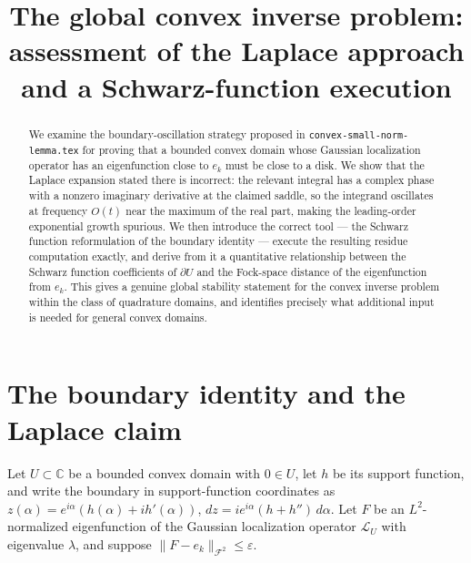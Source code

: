 \documentclass[a4paper,11pt,reqno]{amsart}
\begin{document}
\title{The global convex inverse problem:\\
assessment of the Laplace approach and a Schwarz-function execution}

\maketitle

\begin{abstract}
We examine the boundary-oscillation strategy proposed in
\texttt{convex-small-norm-lemma.tex} for proving that a bounded convex domain
whose Gaussian localization operator has an eigenfunction close to $e_k$ must
be close to a disk. We show that the Laplace expansion stated there is
incorrect: the relevant integral has a complex phase with a nonzero imaginary
derivative at the claimed saddle, so the integrand oscillates at frequency
$O(t)$ near the maximum of the real part, making the leading-order exponential
growth spurious. We then introduce the correct tool --- the Schwarz function
reformulation of the boundary identity --- execute the resulting residue
computation exactly, and derive from it a quantitative relationship between the
Schwarz function coefficients of $\partial U$ and the Fock-space distance of
the eigenfunction from $e_k$.
This gives a genuine global stability statement for the convex inverse problem
within the class of quadrature domains, and identifies precisely what additional
input is needed for general convex domains.
\end{abstract}

\tableofcontents

\section{The boundary identity and the Laplace claim}

Let $U\subset\mathbb{C}$ be a bounded convex domain with $0\in U$, let $h$
be its support function, and write the boundary in support-function
coordinates as $z(\alpha)=e^{i\alpha}(h(\alpha)+ih'(\alpha))$,
$dz=ie^{i\alpha}(h+h'')\,d\alpha$.
Let $F$ be an $L^2$-normalized eigenfunction of the Gaussian localization operator
$\mathcal{L}_U$ with eigenvalue $\lambda$, and suppose
$\|F-e_k\|_{\mathcal{F}^2}\le\varepsilon$.
\end{document}
